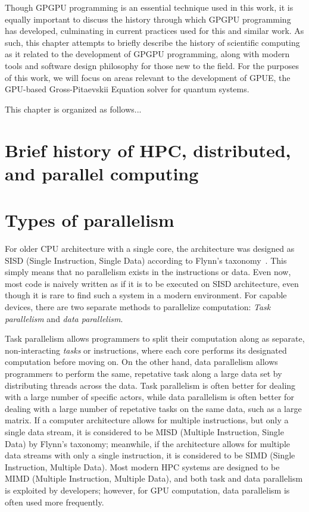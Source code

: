 Though GPGPU programming is an essential technique used in this work, it is equally important to discuss the history through which GPGPU programming has developed, culminating in current practices used for this and similar work.
As such, this chapter attempts to briefly describe the history of scientific computing as it related to the development of GPGPU programming, along with modern tools and software design philosophy for those new to the field.
For the purposes of this work, we will focus on areas relevant to the development of GPUE, the GPU-based Gross-Pitaevskii Equation solver for quantum systems.

This chapter is organized as follows...

\section{Brief history of HPC, distributed, and parallel computing}


\section{Types of parallelism}

For older CPU architecture with a single core, the architecture was designed as SISD (Single Instruction, Single Data) according to Flynn's taxonomy~\cite{gurd1988}. 
This simply means that no parallelism exists in the instructions or data.
Even now, most code is naively written as if it is to be executed on SISD architecture, even though it is rare to find such a system in a modern environment.
For capable devices, there are two separate methods to parallelize computation: \textit{Task parallelism} and \textit{data parallelism}.

Task parallelism allows programmers to split their computation along as separate, non-interacting \textit{tasks} or instructions, where each core performs its designated computation before moving on.
On the other hand, data parallelism allows programmers to perform the same, repetative task along a large data set by distributing threads across the data.
Task parallelism is often better for dealing with a large number of specific actors, while data parallelism is often better for dealing with a large number of repetative tasks on the same data, such as a large matrix.
If a computer architecture allows for multiple instructions, but only a single data stream, it is considered to be MISD (Multiple Instruction, Single Data) by Flynn's taxonomy; meanwhile, if the architecture allows for multiple data streams with only a single instruction, it is considered to be SIMD (Single Instruction, Multiple Data).
Most modern HPC systems are designed to be MIMD (Multiple Instruction, Multiple Data), and both task and data parallelism is exploited by developers; however, for GPU computation, data parallelism is often used more frequently.

